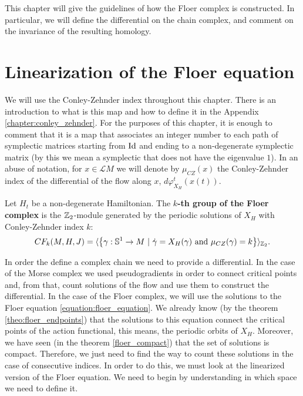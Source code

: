 This chapter will give the guidelines of how the Floer complex is constructed. In particular, we will define the differential on the chain complex, and comment on the invariance of the resulting homology.

\section{Linearization of the Floer equation}

We will use the Conley-Zehnder index throughout this chapter. There is an introduction to what is this map and how to define it in the Appendix \ref{chapter:conley_zehnder}. For the purposes of this chapter, it is enough to comment that it is a map that associates an integer number to each path of symplectic matrices starting from $\mathrm{Id}$ and ending to a non-degenerate symplectic matrix (by this we mean a symplectic that does not have the eigenvalue $1$). In an abuse of notation, for $x \in \mathcal{L}M$ we will denote by $\mu_{CZ}(x)$ the Conley-Zehnder index of the differential of the flow along $x$, $d\varphi_{X_H}^t(x(t))$.

\begin{deff} \label{deff:floer_complex}
Let $H_t$ be a non-degenerate Hamiltonian. The {\bf $k$-th group of the Floer complex} is the $\mathbb{Z}_2$-module generated by the periodic solutions of $X_H$ with Conley-Zehnder index $k$:
\[CF_k(M,H,J) = \langle \left\{ \gamma : \mathbb{S}^1 \rightarrow M \ | \ \dot{\gamma} = X_H(\gamma) \text{ and } \mu_{CZ}(\gamma) = k \right\} \rangle_{\mathbb{Z}_2} .\]
\end{deff}

In order the define a complex chain we need to provide a differential. In the case of the Morse complex we used pseudogradients in order to connect critical points and, from that, count solutions of the flow and use them to construct the differential. In the case of the Floer complex, we will use the solutions to the Floer equation \ref{equation:floer_equation}. We already know (by the theorem \ref{theo:floer_endpoints}) that the solutions to this equation connect the critical points of the action functional, this means, the periodic orbits of $X_H$. Moreover, we have seen (in the theorem \ref{floer_compact}) that the set of solutions is compact. Therefore, we just need to find the way to count these solutions in the case of consecutive indices. In order to do this, we must look at the linearized version of the Floer equation. We need to begin by understanding in which space we need to define it.

